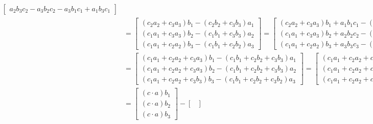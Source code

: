 \documentclass{article}
\begin{document}
\begin{enumerate}[(a)]
\begin{align*}
\begin{bmatrix}
                a_2b_3c_2 - a_3b_2c_2 - a_3b_1c_1 + a_1b_3c_1
            \end{bmatrix}\\
            & = \begin{bmatrix}
                (c_2a_2 + c_3a_3)b_1 - (c_2b_2 + c_3b_3)a_1\\
                (c_1a_1 + c_3a_3)b_2 - (c_1b_1 + c_3b_3)a_2\\
                (c_1a_1 + c_2a_2)b_3 - (c_1b_1 + c_2b_2)a_3
            \end{bmatrix} = \begin{bmatrix}
                (c_2a_2 + c_3a_3)b_1 + a_1b_1c_1 - (c_2b_2 + c_3b_3)a_1 - a_1b_1c_1\\
                (c_1a_1 + c_3a_3)b_2 +a_2b_2c_2  - (c_1b_1 + c_3b_3)a_2 - a_2b_2c_2\\
                (c_1a_1 + c_2a_2)b_3 +a_3b_3c_3 - (c_1b_1 + c_2b_2)a_3 - a_3b_3c_3
            \end{bmatrix}\\
            &= \begin{bmatrix}
                (c_1a_1 + c_2a_2 + c_3a_3)b_1 - (c_1b_1 + c_2b_2 + c_3b_3)a_1\\
                (c_1a_1 +c_2a_2+ c_3a_3)b_2 - (c_1b_1 +c_2b_2+ c_3b_3)a_2\\
                (c_1a_1 + c_2a_2+c_3b_3)b_3 - (c_1b_1 + c_2b_2 + c_3b_2)a_3
            \end{bmatrix} = \begin{bmatrix}
                (c_1a_1 + c_2a_2 + c_3a_3)b_1\\
                (c_1a_1 +c_2a_2+ c_3a_3)b_2\\
                (c_1a_1 + c_2a_2+c_3b_3)b_3
            \end{bmatrix} - \begin{bmatrix}
                (c_1b_1 + c_2b_2 + c_3b_3)a_1\\
                (c_1b_1 +c_2b_2+ c_3b_3)a_2\\
                (c_1b_1 + c_2b_2 + c_3b_2)a_3
            \end{bmatrix}\\
            &= \begin{bmatrix}
                (c\cdot a)b_1\\
                (c\cdot a)b_2\\
                (c\cdot a)b_3
            \end{bmatrix} - \begin{bmatrix}

\end{bmatrix}
\end{align*}
\end{enumerate}
\end{document}
